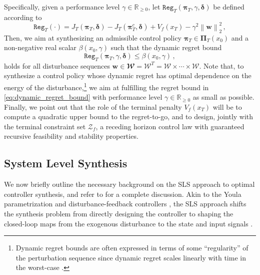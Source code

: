 \documentclass[conference]{IEEEtran}
\newcommand{\norm}[1]{\left\lVert#1\right\rVert}
\begin{document}
Specifically, given a performance level $\gamma \in \mathbb{R}_{\geq 0}$, let $\mathtt{Reg}_T(\bm{\pi}_T, \gamma, \bm{\delta})$ be defined according to
\begin{equation}
    \label{eq:regret_definition}
    \mathtt{Reg}_T(\cdot) = J_T(\bm{\pi}_T, \bm{\delta}) - J_T(\bm{\pi}^c_T, \bm{\delta}) + V_f(x_T) - \gamma^2 \norm{\mathbf{w}}_2^2\,,
\end{equation}
Then, we aim at synthesizing an admissible control policy $\bm{\pi}_T \in \bm{\Pi}_T(x_0)$ and a non-negative real scalar $\beta(x_0, \gamma)$ such that the dynamic regret bound
\begin{equation}
    \label{eq:dynamic_regret_bound}
    \mathtt{Reg}_T(\bm{\pi}_T, \gamma, \bm{\delta}) \leq \beta(x_0, \gamma)\,,
\end{equation}
holds for all disturbance sequences $\mathbf{w} \in \mathbfcal{W} = \mathcal{W}^{T} = \mathcal{W} \times \cdots \times \mathcal{W}$. Note that, to synthesize a control policy whose dynamic regret has optimal dependence on the energy of the disturbance,\footnote{Dynamic regret bounds are often expressed in terms of some ``regularity'' of the perturbation sequence since dynamic regret scales linearly with time in the worst-case \cite{goel2022power, zhao2020dynamic}.} we aim at fulfilling the regret bound in \eqref{eq:dynamic_regret_bound} with performance level $\gamma \in \mathbb{R}_{\geq 0}$ as small as possible. Finally, we point out that the role of the terminal penalty $V_f(x_T)$ will be to compute a quadratic upper bound to the regret-to-go, and to design, jointly with the terminal constraint set $\mathcal{Z}_f$, a receding horizon control law with guaranteed recursive feasibility and stability properties.

\subsection{System Level Synthesis}
\label{subsec:system_level_synthesis}
We now briefly outline the necessary background on the SLS approach to optimal controller synthesis, and refer to \cite{wang2019system} for a complete discussion. Akin to the Youla parametrization \cite{youla1976modern} and disturbance-feedback controllers \cite{goulart2006optimization}, the SLS approach shifts the synthesis problem from directly designing the controller to shaping the closed-loop maps from the exogenous disturbance to the state and input signals \cite{zheng2020equivalence, furieri2019input, furieri2023near}.
\end{document}
